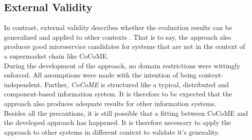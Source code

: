 \subsection{External Validity}
In contrast, external validity describes whether the evaluation results can be generalized and applied to other contexts \cite{Validity}. That is to say, the approach also produces good microservice candidates for systems that are not in the context of a supermarket chain like CoCoME. \\
During the development of the approach, no domain restrictions were wittingly enforced. All assumptions were made with the intention of being context-independent. Further, \textit{CoCoME} is structured like a typical, distributed and component-based information system. It is therefore to be expected that the approach also produces adequate results for other information systems. \\
Besides all the precautions, it is still possible that a fitting between CoCoME and the developed approach has happened. It is therefore necessary to apply the approach to other systems in different context to validate it's generality.








